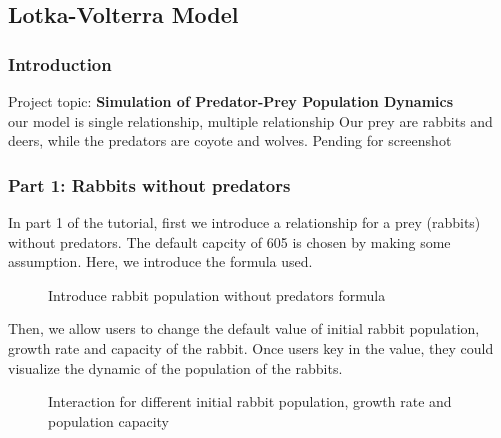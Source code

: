 \documentclass{article}
\begin{document}
\begin{normalsize}
		\subsection{Lotka-Volterra Model}
		\subsubsection{Introduction}
		Project topic: \textbf{Simulation of Predator-Prey Population Dynamics }\\
		our model is single relationship, multiple relationship Our prey are rabbits and deers, while the predators are coyote and wolves.
		Pending for screenshot
		\subsubsection{Part 1: Rabbits without predators}
		In part 1 of the tutorial, first we introduce a relationship for a prey (rabbits) without predators. The default capcity of 605 is chosen by making some assumption. Here, we introduce the formula used. 
			\begin{figure}[H]
			\caption{Introduce rabbit population without predators formula}
			\end{figure}
		
		Then, we allow users to change the default value of initial rabbit population,  growth rate and capacity of the rabbit. Once users key in the value, they could visualize the dynamic of the population of the rabbits.
		\begin{figure}[H]
			\caption{Interaction for different initial rabbit population, growth rate and population capacity }
		\end{figure}
		

\end{normalsize}
\end{document}
